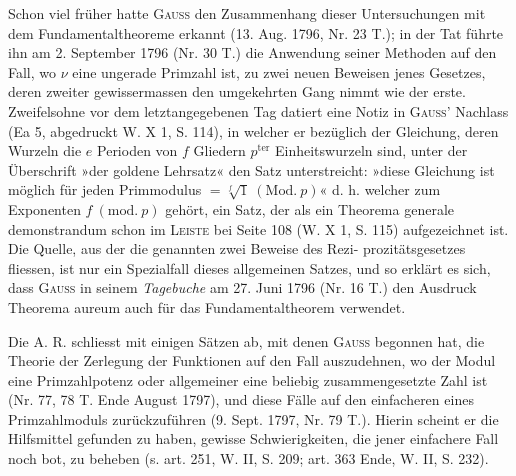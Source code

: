 Schon viel früher hatte \textsc{Gauss} den Zusammenhang dieser Untersuchungen mit dem Fundamentaltheoreme erkannt (13. Aug. 1796, Nr. 23 T.); in der Tat führte ihn am 2. September 1796 (Nr. 30 T.) die Anwendung seiner Methoden auf den Fall, wo \(\nu\) eine ungerade Primzahl ist, zu zwei neuen Beweisen jenes Gesetzes, deren zweiter gewissermassen den umgekehrten Gang nimmt wie der erste. Zweifelsohne vor dem letztangegebenen Tag datiert eine Notiz in \textsc{Gauss}’ Nachlass (Ea 5, abgedruckt W. X 1, S. 114), in welcher er bezüglich der Gleichung, deren Wurzeln die \(e\) Perioden von \(f\) Gliedern \(p^{\mathrm{ter}}\) Einheitswurzeln sind, unter der Überschrift »der goldene Lehrsatz« den Satz unterstreicht: »diese Gleichung ist möglich für jeden Primmodulus \(=\sqrt[f]{1}\ (\mathrm{Mod.}\ p)\)« d. h. welcher zum Exponenten \(f\ (\mathrm{mod.}\ p)\) gehört, ein Satz, der als ein Theorema generale demonstrandum schon im \textsc{Leiste} bei Seite 108 (W. X 1, S. 115) aufgezeichnet ist. Die Quelle, aus der die genannten zwei Beweise des Rezi-
\newpage{}
\noindent prozitätsgesetzes fliessen, ist nur ein Spezialfall dieses allgemeinen Satzes, und so erklärt es sich, dass \textsc{Gauss} in seinem \textit{Tagebuche} am 27. Juni 1796 (Nr. 16 T.) den Ausdruck Theorema aureum auch für das Fundamentaltheorem verwendet.

Die A. R. schliesst mit einigen Sätzen ab, mit denen \textsc{Gauss} begonnen hat, die Theorie der Zerlegung der Funktionen auf den Fall auszudehnen, wo der Modul eine Primzahlpotenz oder allgemeiner eine beliebig zusammengesetzte Zahl ist (Nr. 77, 78 T. Ende August 1797), und diese Fälle auf den einfacheren eines Primzahlmoduls zurückzuführen (9. Sept. 1797, Nr. 79 T.). Hierin scheint er die Hilfsmittel gefunden zu haben, gewisse Schwierigkeiten, die jener einfachere Fall noch bot, zu beheben (s. art. 251, W. II, S. 209; art. 363 Ende, W. II, S. 232).
